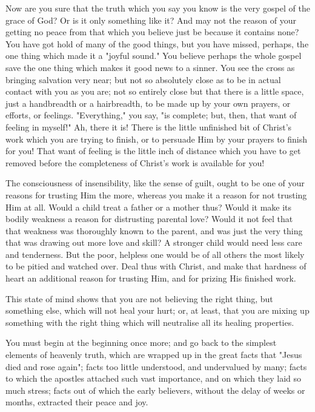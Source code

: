 \documentclass[
]{book}
\begin{document}
Now are you sure that the truth which you say you know is the very gospel of the grace of God? Or is it only something like it? And may not the reason of your getting no peace from that which you believe just be because it contains none? You have got hold of many of the good things, but you have missed, perhaps, the one thing which made it a "joyful sound." You believe perhaps the whole gospel save the one thing which makes it good news to a sinner. You see the cross as bringing salvation very near; but not so absolutely close as to be in actual contact with you as you are; not so entirely close but that there is a little space, just a handbreadth or a hairbreadth, to be made up by your own prayers, or efforts, or feelings. "Everything," you say, "is complete; but, then, that want of feeling in myself!" Ah, there it is! There is the little unfinished bit of Christ's work which you are trying to finish, or to persuade Him by your prayers to finish for you! That want of feeling is the little inch of distance which you have to get removed before the completeness of Christ's work is available for you!

The consciousness of insensibility, like the sense of guilt, ought to be one of your reasons for trusting Him the more, whereas you make it a reason for not trusting Him at all. Would a child treat a father or a mother thus? Would it make its bodily weakness a reason for distrusting parental love? Would it not feel that that weakness was thoroughly known to the parent, and was just the very thing that was drawing out more love and skill? A stronger child would need less care and tenderness. But the poor, helpless one would be of all others the most likely to be pitied and watched over. Deal thus with Christ, and make that hardness of heart an additional reason for trusting Him, and for prizing His finished work.

This state of mind shows that you are not believing the right thing, but something else, which will not heal your hurt; or, at least, that you are mixing up something with the right thing which will neutralise all its healing properties.

You must begin at the beginning once more; and go back to the simplest elements of heavenly truth, which are wrapped up in the great facts that "Jesus died and rose again"; facts too little understood, and undervalued by many; facts to which the apostles attached such vast importance, and on which they laid so much stress; facts out of which the early believers, without the delay of weeks or months, extracted their peace and joy.
\end{document}
